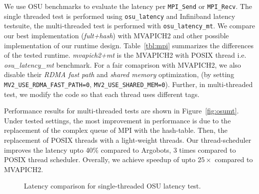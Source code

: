 We use OSU benchmarks \cite{osubench} to evaluate the latency per
\texttt{MPI_Send} or \texttt{MPI_Recv}. The single threaded test is performed
using \texttt{osu_latency} and Infiniband latency testsuite, the multi-threaded
test is performed with \texttt{osu_latency_mt}. We compare our best
implementation (\textit{fult+hash}) with MVAPICH2 and other possible
implementation of our runtime design. Table~\ref{tbl:mpi} summarizes the
differences of the tested runtime.  \textit{mvapich2+mt} is the MVAPICH2 with
POSIX thread i.e. \textit{osu_latency_mt} benchmark. For a fair comaprison with
MVAPICH2, we also disable their \textit{RDMA fast path} and \textit{shared
memory} optimization, (by setting \texttt{MV2_USE_RDMA_FAST_PATH=0},
\texttt{MV2_USE_SHARED_MEM=0}). Further, in multi-threaded test, we modify the
code so that each thread uses different tags.

Performance results for multi-threaded tests are shown in
Figure~\ref{fig:osumt}.  Under tested settings, the most improvement in
performance is due to the replacement of the complex queue of MPI with the
hash-table.  Then, the replacement of POSIX threads with a light-weight
threads. Our thread-scheduler improves the latency upto 40\% compared to
Argobots, $3$ times compared to POSIX thread scheduler. Overally, we achieve
speedup of upto $25\times$ compared to MVAPICH2.

\begin{figure}
  \centering
  \caption{Latency comparison for single-threaded OSU latency test.\label{fig:osu-single}}
\end{figure}

